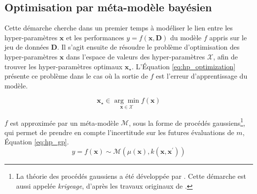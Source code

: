 \subsection{Optimisation par méta-modèle bayésien} \label{subsec:bayesian_opt}
%
% 

Cette démarche cherche dans un premier temps à modéliser le lien entre les hyper-paramètres $\boldsymbol{x}$ et les performances $y = f(\boldsymbol{x}, \boldsymbol{D})$ du modèle $f$ appris sur le jeu de données $\boldsymbol{D}$.
Il s'agit ensuite de résoudre le problème d'optimisation des hyper-paramètres $\boldsymbol{x}$ dans l'espace de valeurs des hyper-paramètres $\mathcal{X}$, afin de trouver les hyper-paramètres optimaux $\boldsymbol{x}_{\star}$.
L'Équation \ref{eq:hp_optimization} présente ce problème dans le cas où la sortie de $f$ est l'erreur d'apprentissage du modèle.

\begin{equation} \label{eq:hp_optimization}
\boldsymbol{x}_{\star} \in \underset{\boldsymbol{x} \in \mathcal{X}}{\arg \min } f(\boldsymbol{x})
\end{equation}

$f$ est approximée par un méta-modèle $\mathcal{M}$, sous la forme de procédés gaussiens\footnote{La théorie des procédés gaussiens a été développée par \citeauthor{matheron_principles_1963} \cite{matheron_principles_1963}. Cette démarche est aussi appelée \textit{krigeage}, d'après les travaux originaux de \citeauthor{krige_statistical_1951} \cite{krige_statistical_1951}.}, qui permet de prendre en compte l'incertitude sur les futures évaluations de $m$, Équation \ref{eq:hp_gp}.
\begin{equation} \label{eq:hp_gp}
y = f(\boldsymbol{x}) \sim \mathcal{M}\left(\mu(\boldsymbol{x}), k\left(\boldsymbol{x}, \boldsymbol{x}^{\prime}\right)\right)
\end{equation}


